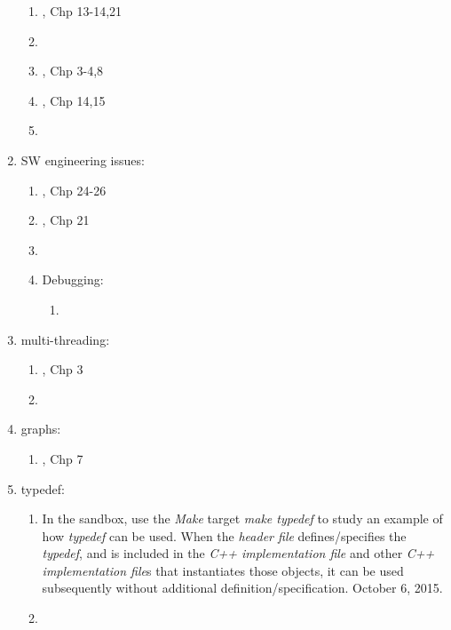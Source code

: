 \begin{enumerate}
\begin{enumerate}
	\item \cite{Oualline2003}, Chp 13-14,21
	\item \cite[pp. 6--8; Chp. 11--12, pp. 245--298; Chp. 14--15, pp. 331--373]{Schildt2003a}
	\item \cite{Vermeir2001}, Chp 3-4,8
	\item \cite{Eckel2000}, Chp 14,15
	\item \cite[Chp. 11--12, pp. 255--325; Chp. 16--17, pp. 419--460]{Schildt1998a}
	\end{enumerate}
\item SW engineering issues: \vspace{-0.3cm}
	\begin{enumerate} \itemsep -2pt
	\item \cite{Gregoire2014}, Chp 24-26
	\item \cite{Allain2012}, Chp 21
	\item \cite[Chp. 4 and 7]{Romanik2003}
	\item Debugging: \vspace{-0.2cm}
		\begin{enumerate} \itemsep -2pt
		\item \cite[\S14.2]{Scheinerman2006}
		\end{enumerate}
	\end{enumerate}
\item multi-threading: \vspace{-0.3cm}
	\begin{enumerate} \itemsep -2pt
	\item \cite{Schildt2004a}, Chp 3
	\item \cite[\S5.1]{Romanik2003}
	\end{enumerate}
\item graphs: \vspace{-0.3cm}
	\begin{enumerate} \itemsep -2pt
	\item \cite{Schildt2004a}, Chp 7
	\end{enumerate}
\item typedef: \vspace{-0.3cm}
	\begin{enumerate} \itemsep -2pt
	\item In the sandbox, use the {\it Make} target {\it make typedef} to study an example of how {\it typedef} can be used. When the {\it header file} defines/specifies the {\it typedef}, and is included in the {\it C++ implementation file} and other {\it C++ implementation file}s that instantiates those objects, it can be used subsequently without additional definition/specification. October 6, 2015.
	\item \cite[pp. 510-512]{Savitch2009}
	\end{enumerate}
\end{enumerate}

